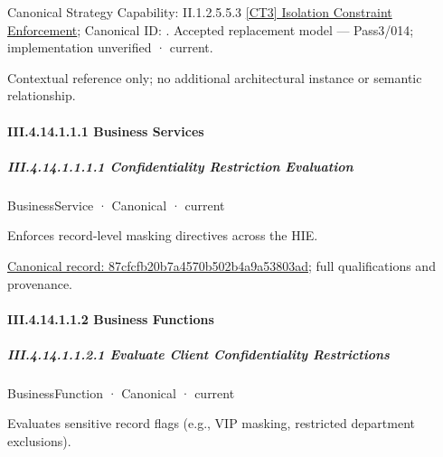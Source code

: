{\small Canonical Strategy Capability: II.1.2.5.5.3 \hyperref[element:2475396dd27745fe80df6c887c064f8a]{[CT3] Isolation Constraint Enforcement}; Canonical ID: \texttt{}. Accepted replacement model — Pass3/014; implementation unverified · current.}\par
Contextual reference only; no additional architectural instance or semantic relationship.\par
\paragraph*{III.4.14.1.1.1 Business Services}
\label{navigation:III.4.14.1.1.1}

\subparagraph*{III.4.14.1.1.1.1 Confidentiality Restriction Evaluation}
\label{navigation:III.4.14.1.1.1.1}

\label{element:87cfcfb20b7a4570b502b4a9a53803ad}
{\small BusinessService · Canonical · current}\par

Enforces record-level masking directives across the HIE.


{\footnotesize \href{../../../../../../../../continuum/business/business-service/87cfcfb20b7a4570b502b4a9a53803ad.md}{Canonical record: 87cfcfb20b7a4570b502b4a9a53803ad}; full qualifications and provenance.}\par
\paragraph*{III.4.14.1.1.2 Business Functions}
\label{navigation:III.4.14.1.1.2}

\subparagraph*{III.4.14.1.1.2.1 Evaluate Client Confidentiality Restrictions}
\label{navigation:III.4.14.1.1.2.1}

\label{element:a61324c3ef734910af5886f048cd3bf5}
{\small BusinessFunction · Canonical · current}\par

Evaluates sensitive record flags (e.g., VIP masking, restricted department exclusions).


